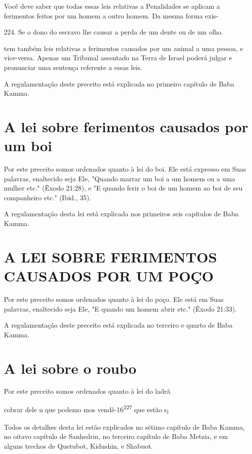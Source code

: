 Você deve saber que todas essas leis relativas a Penalidades se apli­cam
a ferimentos feitos por um homem a outro homem. Da mesma forma exis-

224. Se o dono do escravo lhe causar a perda de um dente ou de um olho.



tem também leis relativas a ferimentos causados por um animal a uma
pessoa, e vice-versa. Apenas um Tribunal assentado na Terra de Israel
poderá julgar e pronunciar uma sentença referente a essas leis.

A regulamentação deste preceito está explicada no primeiro capítu­lo de
Baba Kamma.

\section{A lei sobre ferimentos causados por um boi}

Por este preceito somos ordenados quanto à lei do boi. Ele está
ex­presso em Suas palavras, enaltecido seja Ele, "Quando marrar um boi a
um ho­mem ou a uma mulher etc." (Êxodo 21:28), e "E quando ferir o boi
de um ho­mem ao boi de seu companheiro etc." (Ibid., 35).

A regulamentação desta lei está explicada nos primeiros seis capítu­los
de Baba Kamma.


\section{A LEI SOBRE FERIMENTOS CAUSADOS POR UM POÇO}

Por este preceito somos ordenados quanto à lei do poço. Ele está em Suas
palavras, enaltecido seja Ele, "E quando um homem abrir etc." (Êxodo
21:33).

A regulamentação deste preceito está explicada no terceiro e quarto de
Baba Kamma.

\section{A lei sobre o roubo}


Por este preceito somos ordenados quanto à lei do ladrã


cobrar dele u que podemo mos vendê-16\textsuperscript{227} que estão
s\textsubscript{i}

Todos os detalhes desta lei estão explicados no sétimo capítulo de Baba
Kamma, no oitavo capítulo de Sanhedrin, no terceiro capítulo de Baba
Metzia, e em alguns trechos de Quetubot, Kidushin, e Shabuot.

